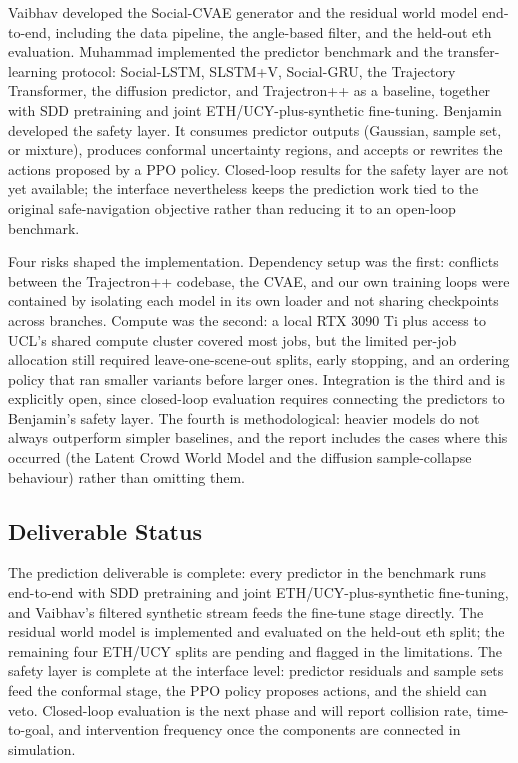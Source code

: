 \documentclass[conference]{IEEEtran}
\begin{document}
Vaibhav developed the Social-CVAE generator and the residual world
model end-to-end, including the data pipeline, the angle-based
filter, and the held-out eth evaluation. Muhammad implemented the
predictor benchmark and the transfer-learning protocol: Social-LSTM,
SLSTM+V, Social-GRU, the Trajectory Transformer, the diffusion
predictor, and Trajectron++ as a baseline, together with SDD
pretraining and joint ETH/UCY-plus-synthetic fine-tuning. Benjamin
developed the safety layer. It consumes predictor outputs (Gaussian,
sample set, or mixture), produces conformal uncertainty regions, and
accepts or rewrites the actions proposed by a PPO policy. Closed-loop
results for the safety layer are not yet available; the interface
nevertheless keeps the prediction work tied to the original
safe-navigation objective rather than reducing it to an open-loop
benchmark.

Four risks shaped the implementation. Dependency setup was the first:
conflicts between the Trajectron++ codebase, the CVAE, and our own
training loops were contained by isolating each model in its own
loader and not sharing checkpoints across branches. Compute was the
second: a local RTX 3090 Ti plus access to UCL's shared compute
cluster covered most jobs, but the limited per-job allocation still
required leave-one-scene-out splits, early stopping, and an ordering
policy that ran smaller variants before larger ones. Integration is the
third and is explicitly open, since closed-loop evaluation requires
connecting the predictors to Benjamin's safety layer. The fourth is
methodological: heavier models do not always outperform simpler
baselines, and the report includes the cases where this occurred (the
Latent Crowd World Model and the diffusion sample-collapse
behaviour) rather than omitting them.

\subsection{Deliverable Status}

The prediction deliverable is complete: every predictor in the
benchmark runs end-to-end with SDD pretraining and joint
ETH/UCY-plus-synthetic fine-tuning, and Vaibhav's filtered synthetic
stream feeds the fine-tune stage directly. The residual world model
is implemented and evaluated on the held-out eth split; the
remaining four ETH/UCY splits are pending and flagged in the
limitations. The safety layer is complete at the interface level:
predictor residuals and sample sets feed the conformal stage, the
PPO policy proposes actions, and the shield can veto. Closed-loop
evaluation is the next phase and will report collision rate,
time-to-goal, and intervention frequency once the components are
connected in simulation.
\end{document}
